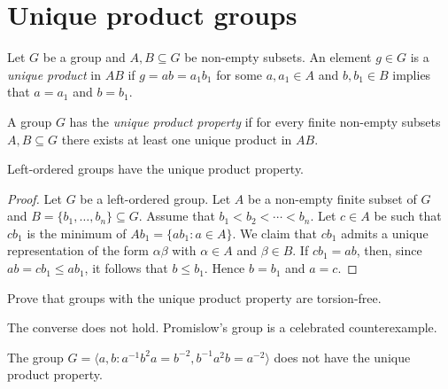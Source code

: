 \section{Unique product groups}
\label{section:UP}

Let $G$ be a group and $A,B\subseteq G$ be non-empty subsets. 
An element $g\in G$ is a \emph{unique product} in $AB$ if $g=ab=a_1b_1$ for some
$a,a_1\in
A$ and $b,b_1\in B$ implies that $a=a_1$ and $b=b_1$.

\begin{definition}
	A group $G$ has the \emph{unique product property} if 
	for every finite non-empty subsets $A,B\subseteq G$ there exists at least one
	unique product in $AB$.
\end{definition}

\begin{proposition}
    Left-ordered groups have the unique product property.
\end{proposition}

\begin{proof}
    Let $G$ be a left-ordered group. 
	Let $A$ be a non-empty finite subset of $G$ and $B=\{b_1,\dots,b_n\}\subseteq G$. 
	Assume that $b_1<b_2<\cdots<b_n$. Let $c\in A$ be such that $cb_1$ is the 
	minimum of $Ab_1=\{ab_1:a\in A\}$. We claim that $cb_1$ admits a unique
	representation of the form $\alpha\beta$ with $\alpha\in A$ and 
	$\beta\in B$. If $cb_1=ab$, then, since $ab=cb_1\leq ab_1$, it follows that 
	$b\leq b_1$. Hence $b=b_1$ and $a=c$. 
\end{proof}

\begin{exercise}
	Prove that groups with the unique product property are
	torsion-free.
\end{exercise}

The converse does not hold. 
Promislow's group is a celebrated counterexample.

\begin{theorem}[Promislow]
    The group $G=\langle a,b:a^{-1}b^2a=b^{-2},b^{-1}a^2b=a^{-2}\rangle$
    does not have the unique product property.
\end{theorem}

